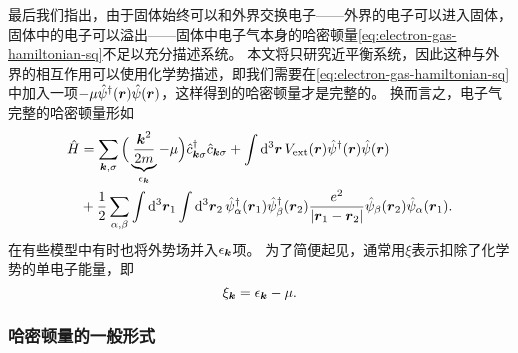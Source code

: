 \documentclass[hyperref, UTF8, a4paper]{ctexart}
\begin{document}
最后我们指出，由于固体始终可以和外界交换电子——外界的电子可以进入固体，固体中的电子可以溢出——固体中电子气本身的哈密顿量\eqref{eq:electron-gas-hamiltonian-sq}不足以充分描述系统。
本文将只研究近平衡系统，因此这种与外界的相互作用可以使用化学势描述，即我们需要在\eqref{eq:electron-gas-hamiltonian-sq}中加入一项$-\mu \hat{\psi}^\dagger(\vb*{r}) \hat{\psi}(\vb*{r})$，这样得到的哈密顿量才是完整的。
换而言之，电子气完整的哈密顿量形如
\begin{equation}
    \begin{aligned}
        \hat{H} &= \sum_{\vb*{k}, \sigma} \Big( \underbrace{\frac{\vb*{k}^2}{2m}}_{\epsilon_{\vb*{k}}} - \mu \Big) \hat{c}^\dagger_{\vb*{k} \sigma} \hat{c}_{\vb*{k} \sigma} 
        + \int \dd[3]{\vb*{r}} V_\text{ext}(\vb*{r}) \hat{\psi}^\dagger(\vb*{r}) \hat{\psi}(\vb*{r}) \\ 
        &+ \frac{1}{2} \sum_{\alpha, \beta} \int \dd[3]{\vb*{r}_1} \int \dd[3]{\vb*{r}_2} 
        \hat{\psi}_\alpha^\dagger (\vb*{r}_1) \hat{\psi}_\beta^\dagger (\vb*{r}_2) \frac{e^2}{\abs{\vb*{r}_1 - \vb*{r}_2}} \hat{\psi}_\beta (\vb*{r}_2) \hat{\psi}_\alpha (\vb*{r}_1).
    \end{aligned}
    \label{eq:full-electron-gas-hamiltonian}
\end{equation}
在有些模型中有时也将外势场并入$\epsilon_{\vb*{k}}$项。
为了简便起见，通常用$\xi$表示扣除了化学势的单电子能量，即
\begin{equation}
    \xi_{\vb*{k}} = \epsilon_{\vb*{k}} - \mu.
\end{equation}

\subsubsection{哈密顿量的一般形式}
\end{document}
